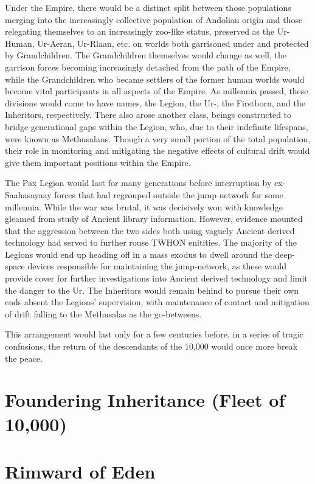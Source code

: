 Under the Empire, there would be a distinct split between those
populations merging into the increasingly collective population of
Andolian origin and those relegating themselves to an increasingly
zoo-like status, preserved as the Ur-Human, Ur-Aeran, Ur-Rlaan,
etc. on worlds both garrisoned under and protected by
Grandchildren. The Grandchildren themselves would change as well, the
garrison forces becoming increasingly detached from the path of the
Empire, while the Grandchildren who became settlers of the former
human worlds would become vital participants in all aspects of the
Empire. As millennia passed, these divisions would come to have names,
the Legion, the Ur-, the Firstborn, and the Inheritors,
respectively. There also arose another class, beings constructed to
bridge generational gaps within the Legion, who, due to their
indefinite lifespans, were known as Methusalans. Though a very small
portion of the total population, their role in monitoring and
mitigating the negative effects of cultural drift would give them
important positions within the Empire.

The Pax Legion would last for many generations before interruption by
ex-Saahasayaay forces that had regrouped outside the jump network for
some millennia. While the war was brutal, it was decisively won with
knowledge gleamed from study of Ancient library information. However,
evidence mounted that the aggression between the two sides both using
vaguely Ancient derived technology had served to further rouse TWHON
enitities. The majority of the Legions would end up heading off in a
mass exodus to dwell around the deep-space devices responsible for
maintaining the jump-network, as these would provide cover for further
investigations into Ancient derived technology and limit the danger to
the Ur. The Inheritors would remain behind to pursue their own ends
absent the Legions' supervision, with maintenance of contact and
mitigation of drift falling to the Methusalas as the go-betweens.

This arrangement would last only for a few centuries before, in a
series of tragic confusions, the return of the descendants of the
10,000 would once more break the peace.

\section{Foundering Inheritance (Fleet of 10,000)}
\section{Rimward of Eden}
